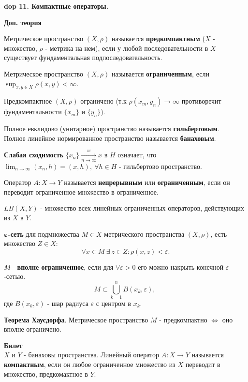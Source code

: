 \textbf{\LARGE dop 11. Компактные операторы.}

\textbf{Доп. теория}


Метрическое пространство $(X,\rho)$ называется \textbf{предкомпактным} ($X$ - множество, $\rho$ - метрика на нем), если у любой последовательности в $X$ существует фундаментальная подпоследовательность.
\bigbreak

Метрическое пространство $(X,\rho)$ называется \textbf{ограниченным}, если $\sup_{x,y \in X}{\rho (x,y)} < \infty$.

Предкомпактное $(X,\rho)$ ограничено (т.к $\rho(x_m,y_n) \rightarrow \infty$ противоречит фундаментальности $\{x_m\}$ и $\{y_n\}$).
\bigbreak

Полное евклидово (унитарное) пространство называется \textbf{гильбертовым}. \\
Полное линейное нормированное пространство называется \textbf{банаховым}.
\bigbreak 

\textbf{Слабая сходимость} $\{x_n\} \xrightarrow[n \rightarrow \infty]{w} x$ в $H$ означает, что $\lim_{n \rightarrow \infty}{(x_n, h)} = (x, h), \ \forall h \in H$ - гильбертово пространство.
\bigbreak

Оператор $A:X \rightarrow Y$ называется \textbf{непрерывным} или \textbf{ограниченным}, если он переводит ограниченное множество в ограниченное.
\bigbreak



$LB(X,Y)$ - множество всех линейных ограниченных операторов, действующих из $X$ в $Y$.
\bigbreak

$\boldsymbol{\varepsilon}$\textbf{-сеть} для подмножества $M \in X$ метрического пространства $(X, \rho)$, есть множество $Z \in X:$
$$
    \forall x \in M \ \exists \ z \in Z: \rho(x,z) < \varepsilon.
$$

$M$ - \textbf{вполне ограниченное}, если для $\forall \varepsilon > 0$ его можно накрыть конечной $\varepsilon$-сетью. 
$$
    M \subset \bigcup_{k=1}^{n} B(x_k, \varepsilon), \ 
$$
где $B(x_k, \varepsilon)$ - шар радиуса $\varepsilon$ с центром в $x_k$.
\bigbreak

\textbf{Теорема Хаусдорфа}. Метрическое пространство $M$ - предкомпактно $\Leftrightarrow$ оно вполне ограничено.
\bigbreak

\textbf{Билет} \\

\mathLet $X$ и $Y$ - банаховы пространства. Линейный оператор $A: X \rightarrow Y$ называется \textbf{компактным}, если он любое ограниченное множество из $X$ переводит в множество, предкомактное в $Y$.
\bigbreak


